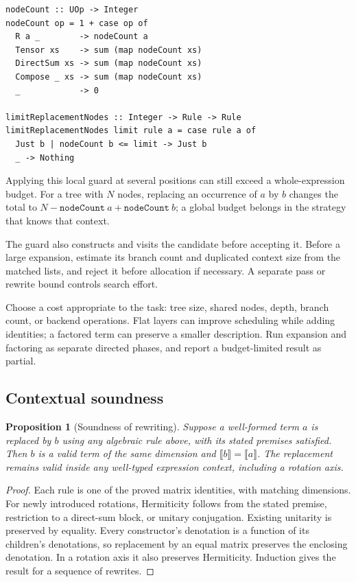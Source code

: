 \documentclass[11pt,a4paper]{article}
\newcommand{\sem}[1]{\llbracket #1\rrbracket}
\newcommand{\code}[1]{\texttt{#1}}
\newtheorem{proposition}{Proposition}
\begin{document}
\begin{lstlisting}
nodeCount :: UOp -> Integer
nodeCount op = 1 + case op of
  R a _        -> nodeCount a
  Tensor xs    -> sum (map nodeCount xs)
  DirectSum xs -> sum (map nodeCount xs)
  Compose _ xs -> sum (map nodeCount xs)
  _            -> 0

limitReplacementNodes :: Integer -> Rule -> Rule
limitReplacementNodes limit rule a = case rule a of
  Just b | nodeCount b <= limit -> Just b
  _ -> Nothing
\end{lstlisting}

Applying this local guard at several positions can still exceed a
whole-expression budget. For a tree with $N$ nodes, replacing an
occurrence of $a$ by $b$ changes the total to
$N-\code{nodeCount}\ a+\code{nodeCount}\ b$; a global budget belongs
in the strategy that knows that context.

The guard also constructs and visits the candidate before accepting it.
Before a large expansion, estimate its branch count and duplicated
context size from the matched lists, and reject it before allocation
if necessary. A separate pass or rewrite bound controls search effort.

Choose a cost appropriate to the task: tree size, shared nodes, depth,
branch count, or backend operations. Flat layers can improve scheduling
while adding identities; a factored term can preserve a smaller
description. Run expansion and factoring as separate directed phases,
and report a budget-limited result as partial.

\subsection{Contextual soundness}

\par\noindent\begin{minipage}{\linewidth}
\begin{proposition}[Soundness of rewriting]
Suppose a well-formed term $a$ is replaced by $b$ using any algebraic
rule above, with its stated premises satisfied.
Then $b$ is a valid term of the same dimension and
$\sem b=\sem a$. The replacement remains valid inside any well-typed
expression context, including a rotation axis.
\end{proposition}
\begin{proof}
Each rule is one of the proved matrix identities, with matching
dimensions. For newly introduced rotations, Hermiticity follows
from the stated premise, restriction to a direct-sum block, or unitary
conjugation. Existing unitarity is preserved by equality. Every
constructor's denotation is a function of its children's denotations,
so replacement by an equal matrix preserves the enclosing denotation.
In a rotation axis it also preserves Hermiticity. Induction gives
the result for a sequence of rewrites.
\end{proof}
\end{minipage}\par
\end{document}
